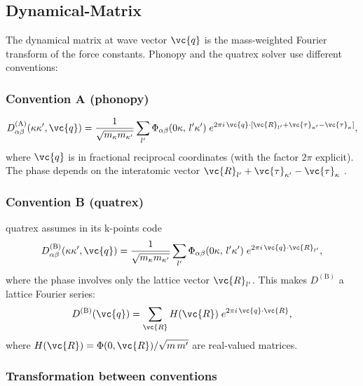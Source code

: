 \subsection{Dynamical-Matrix}
\label{sec:dynmat}

The dynamical matrix at wave vector $\vc{q}$ is the mass-weighted
Fourier transform of the force constants.  Phonopy and the quatrex
solver use different conventions:

\subsubsection{Convention A (phonopy)}

\begin{equation}\label{eq:DA}
  D_{\alpha\beta}^{(\mathrm{A})}(\kappa\kappa',\vc{q})
  = \frac{1}{\sqrt{m_\kappa m_{\kappa'}}}
    \sum_{l'} \Phi_{\alpha\beta}(0\kappa,\,l'\kappa')\;
    e^{2\pi i\,\vc{q}\cdot[\vc{R}_{l'} + \vc{\tau}_{\kappa'} - \vc{\tau}_\kappa]},
\end{equation}
where $\vc{q}$ is in fractional reciprocal coordinates (with the factor
$2\pi$ explicit).  The phase depends on the interatomic vector
$\vc{R}_{l'} + \vc{\tau}_{\kappa'} - \vc{\tau}_\kappa$ \cite{togo_first_2015}.

\subsubsection{Convention B (quatrex)}
\label{sec:convB}

quatrex assumes in its k-points code
\begin{equation}\label{eq:DB}
  D_{\alpha\beta}^{(\mathrm{B})}(\kappa\kappa',\vc{q})
  = \frac{1}{\sqrt{m_\kappa m_{\kappa'}}}
    \sum_{l'} \Phi_{\alpha\beta}(0\kappa,\,l'\kappa')\;
    e^{2\pi i\,\vc{q}\cdot \vc{R}_{l'}},
\end{equation}
where the phase involves only the lattice vector $\vc{R}_{l'}$.  This
makes $D^{(\mathrm{B})}$ a lattice Fourier series:
\begin{equation}\label{eq:fourier_series}
  D^{(\mathrm{B})}(\vc{q})
  = \sum_{\vc{R}} H(\vc{R})\;e^{2\pi i\,\vc{q}\cdot\vc{R}},
\end{equation}
where $H(\vc{R}) = \Phi(0,\vc{R}) / \sqrt{m\,m'}$ are real-valued
matrices.

\subsubsection{Transformation between conventions}
\label{sec:gauge}


